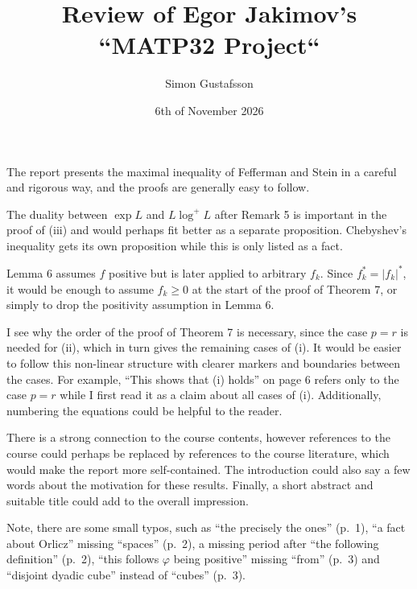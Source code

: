 \documentclass[12pt]{article}
\title{Review of Egor Jakimov's ``MATP32 Project``}
\author{Simon Gustafsson}
\date{6th of November 2026}
\begin{document}
\maketitle

The report presents the maximal inequality of Fefferman and
Stein in a careful and rigorous way, and the proofs are generally easy to
follow. 

The duality between $\exp L$ and $L\log^+ L$ after Remark 5 is important in the proof of (iii)
and would perhaps fit better as a separate proposition. Chebyshev's inequality gets its own proposition
while this is only listed as a fact.

Lemma 6 assumes $f$ positive but is later applied to arbitrary $f_k$. Since
$f_k^* = |f_k|^*$, it would be enough to assume $f_k \geq 0$ at the start of
the proof of Theorem 7, or simply to drop the positivity assumption in Lemma 6.

I see why the order of the proof of Theorem 7 is necessary, since the case $p = r$ is
needed for (ii), which in turn gives the remaining cases of (i). It would be
easier to follow this non-linear structure with clearer markers and boundaries 
between the cases. For example, ``This shows that (i) holds'' on page 6 refers 
only to the case $p = r$ while I first read it as a claim about all cases of (i). 
Additionally, numbering the equations could be helpful to the reader.

There is a strong connection to the course contents, however references to the course
could perhaps be replaced by references to the course literature, which would make the report more
self-contained. The introduction could also say a few words about the motivation for these results. 
Finally, a short abstract and suitable title could add to the overall impression.

Note, there are some small typos, such as ``the precisely the ones'' (p.~1),
``a fact about Orlicz'' missing ``spaces'' (p.~2), a missing period after
``the following definition'' (p.~2), ``this follows $\varphi$ being positive''
missing ``from'' (p.~3) and ``disjoint dyadic cube'' instead of ``cubes'' (p.~3).
\end{document}
